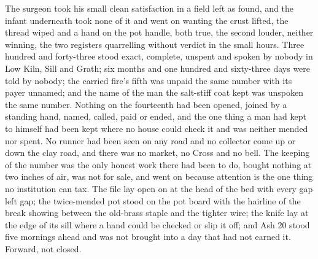 The surgeon took his small clean satisfaction in a field left as found, and the infant underneath took none of it and went on wanting the crust lifted, the thread wiped and a hand on the pot handle, both true, the second louder, neither winning, the two registers quarrelling without verdict in the small hours. Three hundred and forty-three stood exact, complete, unspent and spoken by nobody in Low Kiln, Sill and Grath; six months and one hundred and sixty-three days were told by nobody; the carried fire's fifth was unpaid the same number with its payer unnamed; and the name of the man the salt-stiff coat kept was unspoken the same number. Nothing on the fourteenth had been opened, joined by a standing hand, named, called, paid or ended, and the one thing a man had kept to himself had been kept where no house could check it and was neither mended nor spent. No runner had been seen on any road and no collector come up or down the clay road, and there was no market, no Cross and no bell. The keeping of the number was the only honest work there had been to do, bought nothing at two inches of air, was not for sale, and went on because attention is the one thing no institution can tax. The file lay open on  at the head of the bed with every gap left gap; the twice-mended pot stood on the pot board with the hairline of the break showing between the old-brass staple and the tighter wire; the knife lay at the edge of its sill where a hand could be checked or slip it off; and Ash 20 stood five mornings ahead and was not brought into a day that had not earned it. Forward, not closed.
